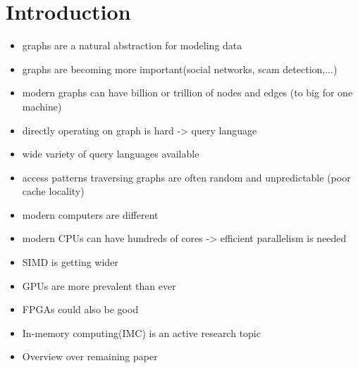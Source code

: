 \documentclass[sigconf,authordraft]{acmart}
\begin{document}

\maketitle

\section{Introduction}

\begin{itemize}
	\item graphs are a natural abstraction for modeling data
	\item graphs are becoming more important(social networks, scam detection,...)
	\item modern graphs can have billion or trillion of nodes and edges (to big for one machine)
	\item directly operating on graph is hard -> query language
	\item wide variety of query languages available

	\item access patterns traversing graphs are often random and unpredictable (poor cache locality)

	\item modern computers are different
	\item modern CPUs can have hundreds of cores -> efficient parallelism is needed
	\item SIMD is getting wider
	\item GPUs are more prevalent than ever
	\item FPGAs could also be good
	\item In-memory computing(IMC) is an active research topic

	\item Overview over remaining paper
\end{itemize}
\end{document}
